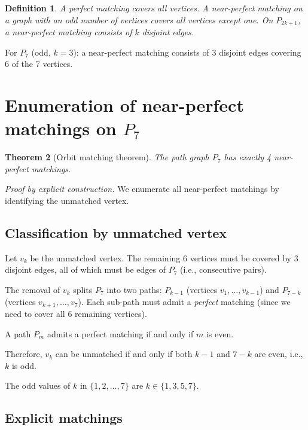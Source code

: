 \documentclass[11pt,letterpaper]{article}
\newtheorem{theorem}{Theorem}[section]
\newtheorem{definition}[theorem]{Definition}
\numberwithin{equation}{section}
\begin{document}
\begin{definition}
A \emph{perfect matching} covers all vertices. A \emph{near-perfect matching}
on a graph with an odd number of vertices covers all vertices except one.
On $P_{2k+1}$, a near-perfect matching consists of $k$ disjoint edges.
\end{definition}

For $P_7$ (odd, $k = 3$): a near-perfect matching consists of 3 disjoint
edges covering 6 of the 7 vertices.

\section{Enumeration of near-perfect matchings on $P_7$}
\label{sec:enumeration}

\begin{theorem}[Orbit matching theorem]
\label{thm:orbit_matching}
The path graph $P_7$ has exactly 4 near-perfect matchings.
\end{theorem}

\textit{Proof by explicit construction.}
We enumerate all near-perfect matchings by identifying the unmatched vertex.

\subsection{Classification by unmatched vertex}

Let $v_k$ be the unmatched vertex. The remaining 6 vertices must be covered
by 3 disjoint edges, all of which must be edges of $P_7$ (i.e., consecutive
pairs).

The removal of $v_k$ splits $P_7$ into two paths: $P_{k-1}$ (vertices $v_1, \ldots, v_{k-1}$)
and $P_{7-k}$ (vertices $v_{k+1}, \ldots, v_7$). Each sub-path must admit a
\emph{perfect} matching (since we need to cover all 6 remaining vertices).

A path $P_m$ admits a perfect matching if and only if $m$ is even.

Therefore, $v_k$ can be unmatched if and only if both $k - 1$ and $7 - k$
are even, i.e., $k$ is odd.

The odd values of $k$ in $\{1, 2, \ldots, 7\}$ are $k \in \{1, 3, 5, 7\}$.

\subsection{Explicit matchings}
\end{document}
